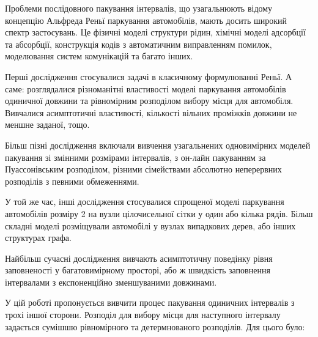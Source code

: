 
Проблеми послідовного пакування інтервалів, що узагальнюють відому концепцію Альфреда Реньї паркування автомобілів, мають досить широкий спектр застосувань. Це фізичні моделі структури рідин, хімічні моделі адсорбції та абсорбції, конструкція кодів з автоматичним виправленням помилок, моделювання систем комунікацій та багато інших.

Перші дослідження стосувалися задачі в класичному формулюванні Реньї. А саме: розглядалися різноманітні властивості моделі паркування автомобілів одиничної довжини та рівномірним розподілом вибору місця для автомобіля. Вивчалися асимптотичні властивості, кількості вільних проміжків довжини не меншне заданої, тощо.

Більш пізні дослідження включали вивчення узагальнених одновимірних моделей пакування зі змінними розмірами інтервалів, з он-лайн пакуванням за Пуассонівським розподілом, різними сімействами абсолютно неперервних розподілів з певними обмеженнями.

У той же час, інші дослідження стосувалися спрощеної моделі паркування автомобілів розміру 2 на вузли цілочисельної сітки у один або кілька рядів. Більш складні моделі розміщували автомобілі у вузлах випадкових дерев, або інших структурах графа.

Найбільш сучасні дослідження вивчають асимптотичну поведінку рівня заповненості у багатовимірному просторі, або ж швидкість заповнення інтервалами з експоненційно зменшуваними довжинами.

У цій роботі пропонується вивчити процес пакування одиничних інтервалів з трохі іншої сторони. Розподіл для вибору місця для наступного інтервалу задається сумішшю рівномірного та детермнованого розподілів. Для цього було:

